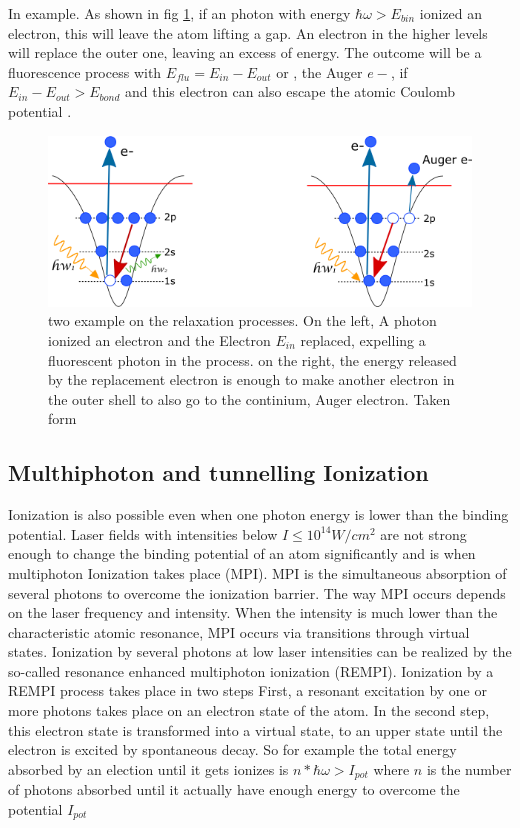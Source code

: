 In example. As shown in fig \ref{fig:augerfluorec}, if an photon  with energy $\hbar\omega > E_{bin}$  ionized an electron, this will leave the atom lifting a gap. An electron in the higher levels will replace the outer one, leaving an excess of energy. The outcome will be a fluorescence process with $E_{flu} = E_{in}- E_{out}$ or , the Auger $e-$, if $ E_{in}-E_{out} > E_{bond}$ and this electron can also escape the atomic Coulomb potential \cite{schmidt_electron_1997}.

\begin{figure}[hbtp] 
\label{fig:augerfluorec}
\centering
\includegraphics[width=6 cm]{../Images/text6418.png}
\caption[Relaxation processes for photoionization]{two example on the relaxation processes. On the left, A photon ionized an electron and the Electron $E_{in}$ replaced, expelling a fluorescent photon in the process. on the right, the energy released by the replacement electron is enough to make another electron in the outer shell to also go to the continium, Auger electron. Taken form \cite{rafipoor_two-color_2017}}
\end{figure}

\subsection{Multhiphoton and tunnelling Ionization}

Ionization is also possible even when one photon energy is lower than the binding potential. Laser fields with intensities below $I \leqslant 10^{14}W/cm^{2}$ are not strong enough to change the binding potential of an atom significantly \cite{rhodes_multiphoton_1985} and is when multiphoton Ionization takes place (MPI).  MPI is the simultaneous absorption of several photons to overcome the ionization barrier. The way MPI occurs depends on the laser frequency and intensity. When the intensity is much lower than the characteristic atomic resonance, MPI occurs via transitions through virtual states. Ionization by several photons at low laser intensities can be realized by the so-called resonance enhanced multiphoton ionization (REMPI)\cite{mainfray_multiphoton_nodate}.  Ionization by a REMPI process takes place in two steps
First, a resonant excitation by one or more photons takes place on an electron state of the atom. In the second step, this electron state is transformed into a virtual state, to an upper state until the electron is excited by spontaneous decay. So for example the total energy absorbed by an election until it gets ionizes is $n * \hbar\omega > I_{pot}$ where $n$ is the number of photons absorbed until it actually have enough energy to overcome the potential $I_{pot}$

